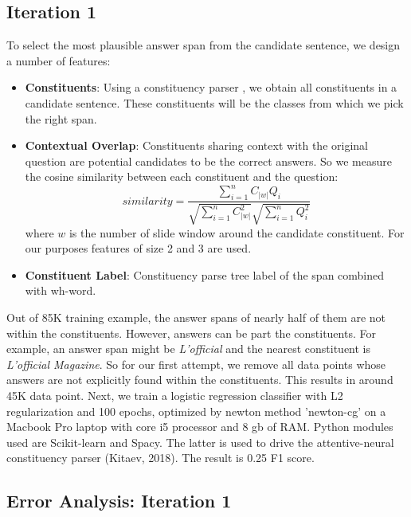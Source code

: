 \subsection{Iteration 1}
To select the most plausible answer span from the candidate sentence, we design a number of features:
\begin{itemize}
\item \textbf{Constituents}: Using a constituency parser \cite{kitaev2018constituency}, we obtain all constituents in a candidate sentence. These constituents will be the classes from which we pick the right span.
\item \textbf{Contextual Overlap}: Constituents sharing context with the original question are potential candidates to be the correct answers. So we measure the cosine similarity between each constituent and the question:
$${ similarity } = \frac { \sum _ { i = 1 } ^ { n } C _ { |w| } Q _ { i } } { \sqrt { \sum _ { i = 1 } ^ { n } C _ { |w| } ^ { 2 } } \sqrt { \sum _ { i = 1 } ^ { n } Q _ { i } ^ { 2 } } }$$ 
where $w$ is the number of slide window around the candidate constituent. For our purposes features of size 2 and 3 are used. 

\item \textbf{Constituent Label}: Constituency parse tree label of the span combined with wh-word.
\end{itemize}
Out of 85K training example, the answer spans of nearly half of them are not within the constituents. However, answers can be part the constituents.  For example, an answer span might be \textit{L'official} and the nearest constituent is \textit{L'official Magazine}. So for our first attempt, we remove all data points whose answers are not explicitly found within the constituents. This results in around 45K data point. Next, we train a logistic regression classifier with L2 regularization and 100 epochs, optimized by newton method 'newton-cg' on a Macbook Pro laptop with core i5 processor and 8 gb of RAM. Python modules used are Scikit-learn and Spacy. The latter is used to drive the attentive-neural constituency parser (Kitaev, 2018). The result is 0.25 F1 score.




\subsection{Error Analysis: Iteration 1}

